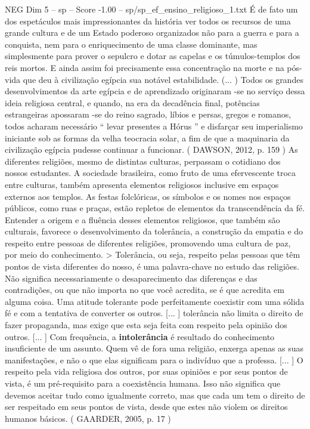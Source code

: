 \begin{textsample}{NEG Dim 5 – sp – Score -1.00 – sp/sp\_ef\_ensino\_religioso\_1.txt}
É de fato um dos espetáculos mais impressionantes da história ver todos os recursos de uma grande cultura e de um Estado poderoso organizados não para a guerra e para a conquista, nem para o enriquecimento de uma classe dominante, mas simplesmente para prover o sepulcro e dotar as capelas e os túmulos-templos dos reis mortos.
E ainda assim foi precisamente essa concentração na morte e na pós-vida que deu à civilização egípcia sua notável estabilidade. (... ) Todos os grandes desenvolvimentos da arte egípcia e de aprendizado originaram -se no serviço dessa ideia religiosa central, e quando, na era da decadência final, potências estrangeiras apossaram -se do reino sagrado, líbios e persas, gregos e romanos, todos acharam necessário “ levar presentes a Hórus ” e disfarçar seu imperialismo iniciante sob as formas da velha teocracia solar, a fim de que a maquinaria da civilização egípcia pudesse continuar a funcionar. ( DAWSON, 2012, p. 159 ) As diferentes religiões, mesmo de distintas culturas, perpassam o cotidiano dos nossos estudantes.
A sociedade brasileira, como fruto de uma efervescente troca entre culturas, também apresenta elementos religiosos inclusive em espaços externos aos templos.
As festas folclóricas, os símbolos e os nomes nos espaços públicos, como ruas e praças, estão repletos de elementos da transcendência da fé.
Entender a origem e a fluência desses elementos religiosos, que também são culturais, favorece o desenvolvimento da tolerância, a construção da empatia e do respeito entre pessoas de diferentes religiões, promovendo uma cultura de paz, por meio do conhecimento. > Tolerância, ou seja, respeito pelas pessoas que têm pontos de vista diferentes do nosso, é uma palavra-chave no estudo das religiões.
Não significa necessariamente o desaparecimento das diferenças e das contradições, ou que não importa no que você acredita, se é que acredita em alguma coisa.
Uma atitude tolerante pode perfeitamente coexistir com uma sólida fé e com a tentativa de converter os outros. [... ] tolerância não limita o direito de fazer propaganda, mas exige que esta seja feita com respeito pela opinião dos outros. [... ] Com frequência, a \textbf{intolerância} é resultado do conhecimento insuficiente de um assunto.
Quem vê de fora uma religião, enxerga apenas as suas manifestações, e não o que elas significam para o indivíduo que a professa. [... ] O respeito pela vida religiosa dos outros, por suas opiniões e por seus pontos de vista, é um pré-requisito para a coexistência humana.
Isso não significa que devemos aceitar tudo como igualmente correto, mas que cada um tem o direito de ser respeitado em seus pontos de vista, desde que estes não violem os direitos humanos básicos. ( GAARDER, 2005, p. 17 )

\end{textsample}

